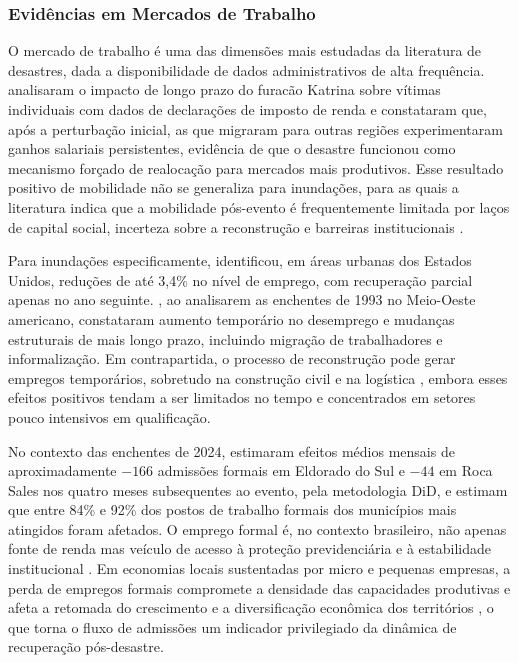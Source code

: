 \documentclass[a4paper,12pt]{article}
\begin{document}
\subsubsection{Evidências em Mercados de Trabalho}

O mercado de trabalho é uma das dimensões mais estudadas da literatura de desastres,
dada a disponibilidade de dados administrativos de alta frequência.
 analisaram o impacto de longo prazo do furacão Katrina sobre
vítimas individuais com dados de declarações de imposto de renda e constataram que, após
a perturbação inicial, as que migraram para outras regiões experimentaram ganhos salariais
persistentes, evidência de que o desastre funcionou como mecanismo forçado de
realocação para mercados mais produtivos. Esse resultado positivo de mobilidade não se
generaliza para inundações, para as quais a literatura indica que a mobilidade pós-evento
é frequentemente limitada por laços de capital social, incerteza sobre a reconstrução e
barreiras institucionais \cite{botzen2019}.

Para inundações especificamente,  identificou, em áreas
urbanas dos Estados Unidos, reduções de até 3,4\% no nível de emprego, com recuperação
parcial apenas no ano seguinte. , ao analisarem as enchentes de 1993
no Meio-Oeste americano, constataram aumento temporário no desemprego e mudanças
estruturais de mais longo prazo, incluindo migração de trabalhadores e informalização.
Em contrapartida, o processo de reconstrução pode gerar empregos temporários, sobretudo
na construção civil e na logística \cite{du2010}, embora esses efeitos positivos tendam a
ser limitados no tempo e concentrados em setores pouco intensivos em qualificação.

No contexto das enchentes de 2024,  estimaram efeitos médios
mensais de aproximadamente $-166$ admissões formais em Eldorado do Sul e $-44$ em
Roca Sales nos quatro meses subsequentes ao evento, pela metodologia DiD, e
 estimam que entre 84\% e 92\% dos postos de trabalho formais dos
municípios mais atingidos foram afetados. O emprego formal é, no contexto brasileiro, não
apenas fonte de renda mas veículo de acesso à proteção previdenciária e à estabilidade
institucional \cite{krein2012, montagner2003}. Em economias locais sustentadas por
micro e pequenas empresas, a perda de empregos formais compromete a densidade das
capacidades produtivas e afeta a retomada do crescimento e a diversificação econômica
dos territórios \cite{oclery2024}, o que torna o fluxo de admissões um indicador
privilegiado da dinâmica de recuperação pós-desastre.
\end{document}
